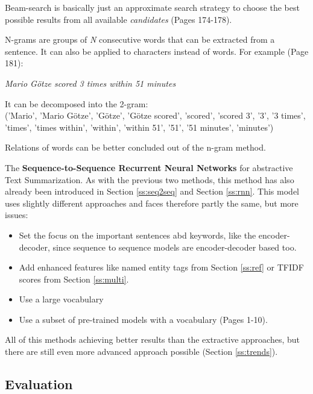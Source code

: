 Beam-search is basically just an approximate search strategy to choose the best possible results from all available \textit{candidates} \cite{beam} (Pages 174-178). 

N-grams are groups of \textit{N} consecutive words that can be extracted from
a sentence. It can also be applied to characters instead of words. For example \cite{py} (Page 181):

\begin{tcolorbox}
	\begin{center}
		\textit{Mario Götze scored 3 times within 51 minutes} \\ 
	\end{center}
	
	It can be decomposed into the 2-gram:\\
	
	('Mario', 'Mario Götze', 'Götze', 'Götze scored', 'scored', 'scored 3', '3', '3 times', 'times',
	'times within', 'within', 'within 51', '51', '51 minutes', 'minutes')
\end{tcolorbox}

Relations of words can be better concluded out of the n-gram method.


The \textbf{Sequence-to-Sequence Recurrent Neural Networks} for abstractive Text Summarization. As with the previous two methods, this method has also already been introduced in Section \ref{ss:seq2seq} and Section \ref{ss:rnn}. This model uses slightly different approaches and faces therefore partly the same, but more issues:

\begin{itemize}
	\item Set the focus on the important sentences abd keywords, like the encoder-decoder, since sequence to sequence models are encoder-decoder based too.
	\item Add enhanced features like named entity tags from Section \ref{ss:ref} or TFIDF scores from Section \ref{ss:multi}. 
	\item Use a large vocabulary
	\item Use a subset of pre-trained models with a vocabulary \cite{jean-etal-2015-using} (Pages 1-10).
\end{itemize}

All of this methods achieving better results than the extractive approaches, but there are still even more advanced approach possible (Section \ref{ss:trends}). 

\subsection{Evaluation}\label{ss:ev}

